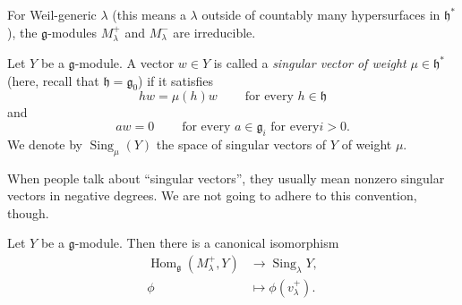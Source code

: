 \documentclass[etingof-lie.tex]{subfiles}
\begin{document}
\begin{corollary}
\label{cor.verma.irred}For Weil-generic $\lambda$ (this means a $\lambda$
outside of countably many hypersurfaces in $\mathfrak{h}^{\ast}$), the
$\mathfrak{g}$-modules $M_{\lambda}^{+}$ and $M_{\lambda}^{-}$ are irreducible.
\end{corollary}

\begin{definition}
Let $Y$ be a $\mathfrak{g}$-module. A vector $w\in Y$ is called a
\textit{singular vector of weight }$\mu\in\mathfrak{h}^{\ast}$ (here, recall
that $\mathfrak{h}=\mathfrak{g}_{0}$) if it satisfies%
\[
hw=\mu\left(  h\right)  w\ \ \ \ \ \ \ \ \ \ \text{for every }h\in\mathfrak{h}%
\]
and%
\[
aw=0\ \ \ \ \ \ \ \ \ \ \text{for every }a\in\mathfrak{g}_{i}\text{ for every
}i>0\text{.}%
\]
We denote by $\operatorname*{Sing}\nolimits_{\mu}\left(  Y\right)  $ the space
of singular vectors of $Y$ of weight $\mu$.
\end{definition}

When people talk about ``singular vectors'', they usually mean nonzero
singular vectors in negative degrees. We are not going to adhere to this
convention, though.

\begin{lemma}
\label{lem.singvec}Let $Y$ be a $\mathfrak{g}$-module. Then there is a
canonical isomorphism%
\begin{align*}
\operatorname*{Hom}\nolimits_{\mathfrak{g}}\left(  M_{\lambda}^{+},Y\right)
&  \rightarrow\operatorname*{Sing}\nolimits_{\lambda}Y,\\
\phi &  \mapsto\phi\left(  v_{\lambda}^{+}\right)  .
\end{align*}

\end{lemma}
\end{document}
